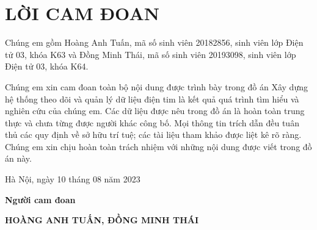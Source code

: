 \section*{LỜI CAM ĐOAN} %
\thispagestyle{empty}

Chúng em gồm Hoàng Anh Tuấn, mã số sinh viên 20182856, sinh viên lớp Điện tử 03, khóa K63 và Đồng Minh Thái, mã số sinh viên 20193098, sinh viên lớp Điện tử 03, khóa K64.

Chúng em xin cam đoan toàn bộ nội dung được trình bày trong đồ án Xây dựng hệ thống theo dõi và quản lý dữ liệu điện tim là kết quả quá trình tìm hiểu và
nghiên cứu của chúng em. Các dữ liệu được nêu trong đồ án là hoàn toàn trung thực
và chưa từng được người khác công bố. Mọi thông tin trích dẫn đều tuân thủ các quy
định về sở hữu trí tuệ; các tài liệu tham khảo được liệt kê rõ ràng. Chúng em xin
chịu hoàn toàn trách nhiệm với những nội dung được viết trong đồ án này.


\vspace{6pt}

\hspace{8cm}Hà Nội, ngày 10 tháng 08 năm 2023

\hspace{9cm}\textbf{Người cam đoan}

\vspace{1cm}
\hspace{7cm}\textbf{HOÀNG ANH TUẤN, ĐỒNG MINH THÁI}

\cleardoublepage